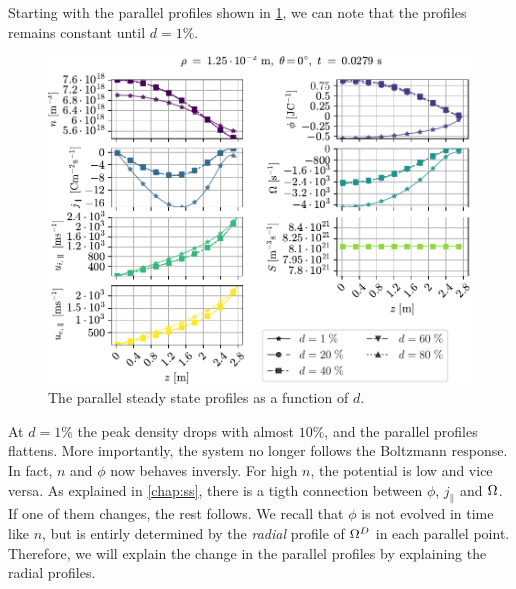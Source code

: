 Starting with the parallel profiles shown in \cref{fig:nnScanPar}, we can note that the profiles remains constant until $d=1\%$.
%
\begin{figure}[htb]
    \centering
    \includegraphics{fig/results/neutral/nnScanPar}
    \caption{The parallel steady state profiles as a function of $d$.}
    \label{fig:nnScanPar}
\end{figure}
%
At $d=1\%$ the peak density drops with almost $10\%$, and the parallel profiles flattens.
More importantly, the system no longer follows the Boltzmann response.
In fact, $n$ and $\phi$ now behaves inversly.
For high $n$, the potential is low and vice versa.
As explained in \cref{chap:ss}, there is a tigth connection between $\phi$, $j_\|$ and $\Omega$.
If one of them changes, the rest follows.
We recall that $\phi$ is not evolved in time like $n$, but is entirly determined by the \emph{radial} profile of $\Omega^D$ in each parallel point.
Therefore, we will explain the change in the parallel profiles by explaining the radial profiles.

